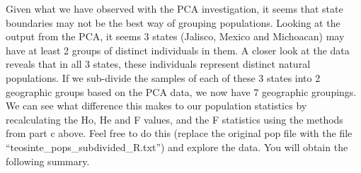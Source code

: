 \documentclass[
]{book}
\newenvironment{Shaded}{\begin{snugshade}}{\end{snugshade}}
\newcommand{\AttributeTok}[1]{\textcolor[rgb]{0.77,0.63,0.00}{#1}}
\newcommand{\DecValTok}[1]{\textcolor[rgb]{0.00,0.00,0.81}{#1}}
\newcommand{\FunctionTok}[1]{\textcolor[rgb]{0.00,0.00,0.00}{#1}}
\newcommand{\NormalTok}[1]{#1}
\newcommand{\OtherTok}[1]{\textcolor[rgb]{0.56,0.35,0.01}{#1}}
\newcommand{\SpecialCharTok}[1]{\textcolor[rgb]{0.00,0.00,0.00}{#1}}
\newcommand{\StringTok}[1]{\textcolor[rgb]{0.31,0.60,0.02}{#1}}
\begin{document}
\begin{Shaded}
\end{Shaded}

Given what we have observed with the PCA investigation, it seems that state boundaries may not be the best way of grouping populations. Looking at the output from the PCA, it seems 3 states (Jalisco, Mexico and Michoacan) may have at least 2 groups of distinct individuals in them. A closer look at the data reveals that in all 3 states, these individuals represent distinct natural populations. If we sub-divide the samples of each of these 3 states into 2 geographic groups based on the PCA data, we now have 7 geographic groupings. We can see what difference this makes to our population statistics by recalculating the Ho, He and F values, and the F statistics using the methods from part c above. Feel free to do this (replace the original pop file with the file ``teosinte\_pops\_subdivided\_R.txt'') and explore the data. You will obtain the following summary.
\end{document}
